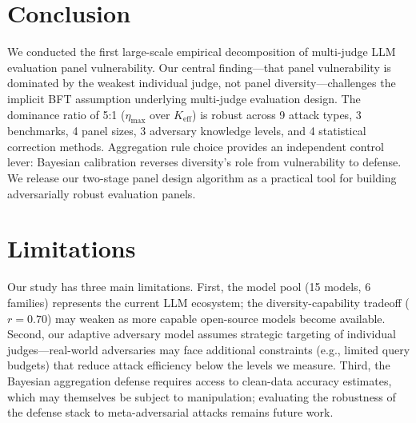 \documentclass[11pt,a4paper]{article}
\begin{document}
\section{Conclusion}

We conducted the first large-scale empirical decomposition of multi-judge LLM evaluation panel vulnerability. Our central finding---that panel vulnerability is dominated by the weakest individual judge, not panel diversity---challenges the implicit BFT assumption underlying multi-judge evaluation design. The dominance ratio of 5:1 ($\eta_{\max}$ over $K_{\text{eff}}$) is robust across 9 attack types, 3 benchmarks, 4 panel sizes, 3 adversary knowledge levels, and 4 statistical correction methods. Aggregation rule choice provides an independent control lever: Bayesian calibration reverses diversity's role from vulnerability to defense. We release our two-stage panel design algorithm as a practical tool for building adversarially robust evaluation panels.

\section*{Limitations}

Our study has three main limitations. First, the model pool (15 models, 6 families) represents the current LLM ecosystem; the diversity-capability tradeoff ($r = 0.70$) may weaken as more capable open-source models become available. Second, our adaptive adversary model assumes strategic targeting of individual judges---real-world adversaries may face additional constraints (e.g., limited query budgets) that reduce attack efficiency below the levels we measure. Third, the Bayesian aggregation defense requires access to clean-data accuracy estimates, which may themselves be subject to manipulation; evaluating the robustness of the defense stack to meta-adversarial attacks remains future work.
\end{document}
